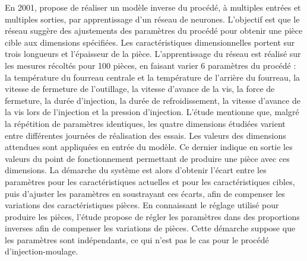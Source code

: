 En 2001, \cite{lau_neural_2001} propose de réaliser un modèle inverse du procédé, à multiples entrées et multiples sorties, par apprentissage d'un réseau de neurones. %
L’objectif est que le réseau suggère des ajustements des paramètres du procédé pour obtenir une pièce cible aux dimensions spécifiées.
Les caractéristiques dimensionnelles portent sur trois longueurs et l'épaisseur de la pièce.
L'apprentissage du réseau est réalisé sur les mesures récoltés pour 100 pièces, en faisant varier 6 paramètres du procédé : la température du fourreau centrale et la température de l'arrière du fourreau, la vitesse de fermeture de l’outillage, la vitesse d’avance de la vis, la force de fermeture, la durée d'injection, la durée de refroidissement, la vitesse d'avance de la vis lors de l'injection et la pression d'injection.
L'étude mentionne que, malgré la répétition de paramètres identiques, les quatre dimensions étudiées varient entre différentes journées de réalisation des essais.
Les valeurs des dimensions attendues sont appliquées en entrée du modèle.
Ce dernier indique en sortie les valeurs du point de fonctionnement permettant de produire une pièce avec ces dimensions.
La démarche du système est alors d'obtenir l'écart entre les paramètres pour les caractéristiques actuelles et pour les caractéristiques cibles, puis d'ajuster les paramètres en soustrayant ces écarts, afin de compenser les variations des caractéristiques pièces.
En connaissant le réglage utilisé pour produire les pièces, l'étude propose de régler les paramètres dans des proportions inverses afin de compenser les variations de pièces.
Cette démarche suppose que les paramètres sont indépendants, ce qui n'est pas le cas pour le procédé d'injection-moulage.

